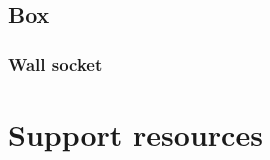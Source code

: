 \documentclass[
a4paper,     %
 headsepline, %
 footsepline, %
 titlepage,   %
 fleqn,       %
12pt         %
]{scrartcl}  %
\begin{document}
\subsection{Box}
\label{sec:box}

\subsubsection{Wall socket}
\label{sec:wall-socket}

\section{Support resources}






 \appendix  %

 

 
\end{document}
